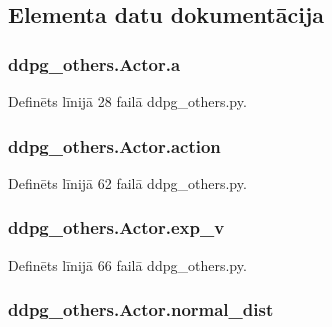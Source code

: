 \subsection{Elementa datu dokumentācija}
\subsubsection[{\texorpdfstring{a}{a}}]{\setlength{\rightskip}{0pt plus 5cm}ddpg\+\_\+others.\+Actor.\+a}\hypertarget{classddpg__others_1_1_actor_a0f1edbd513cea82df55361aa67ad8794}{}\label{classddpg__others_1_1_actor_a0f1edbd513cea82df55361aa67ad8794}


Definēts līnijā 28 failā ddpg\+\_\+others.\+py.

\subsubsection[{\texorpdfstring{action}{action}}]{\setlength{\rightskip}{0pt plus 5cm}ddpg\+\_\+others.\+Actor.\+action}\hypertarget{classddpg__others_1_1_actor_af0e54cc024b2982a2dea08d5e9091d2b}{}\label{classddpg__others_1_1_actor_af0e54cc024b2982a2dea08d5e9091d2b}


Definēts līnijā 62 failā ddpg\+\_\+others.\+py.

\subsubsection[{\texorpdfstring{exp\+\_\+v}{exp_v}}]{\setlength{\rightskip}{0pt plus 5cm}ddpg\+\_\+others.\+Actor.\+exp\+\_\+v}\hypertarget{classddpg__others_1_1_actor_a09356bb2eb8c4b490d6e87ff42e0391d}{}\label{classddpg__others_1_1_actor_a09356bb2eb8c4b490d6e87ff42e0391d}


Definēts līnijā 66 failā ddpg\+\_\+others.\+py.

\subsubsection[{\texorpdfstring{normal\+\_\+dist}{normal_dist}}]{\setlength{\rightskip}{0pt plus 5cm}ddpg\+\_\+others.\+Actor.\+normal\+\_\+dist}\hypertarget{classddpg__others_1_1_actor_a4568b60363c36199737afcb5f7737d8f}{}\label{classddpg__others_1_1_actor_a4568b60363c36199737afcb5f7737d8f}


